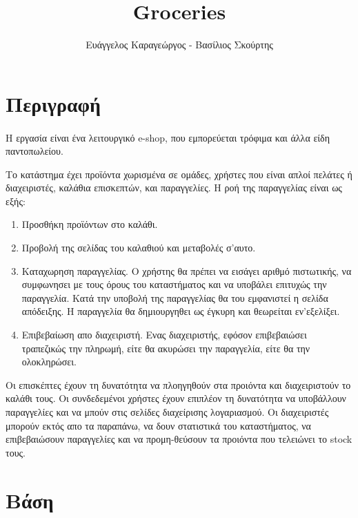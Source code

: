\documentclass[12pt]{article}
\title{Groceries}
\author{Ευάγγελος Καραγεώργος - Βασίλιος Σκούρτης }
\date{}
\begin{document}
  \maketitle
  \section{Περιγραφή}
  	\paragraph{}
  	  Η εργασία είναι ένα λειτουργικό e-shop, που εμπορεύεται τρόφιμα και άλλα είδη παντοπωλείου. 
  	  \par Το κατάστημα έχει προϊόντα χωρισμένα σε ομάδες, χρήστες που είναι απλοί πελάτες ή διαχειριστές, καλάθια επισκεπτών, και παραγγελίες. Η ροή της παραγγελίας είναι ως εξής:
  	  \begin{enumerate}
  	  	\item Προσθήκη προϊόντων στο καλάθι.
  	  	\item Προβολή της σελίδας του καλαθιού και μεταβολές σ'αυτο.
  	  	\item Καταχωρηση παραγγελίας. Ο χρήστης θα πρέπει να εισάγει αριθμό πιστωτικής, να συμφωνησει με τους όρους του καταστήματος και να υποβάλει επιτυχώς την παραγγελία. Κατά την υποβολή της παραγγελίας θα του εμφανιστεί η σελίδα απόδειξης. Η παραγγελία θα δημιουργηθει ως έγκυρη και θεωρείται εν'εξελίξει.
  	  	\item Επιβεβαίωση απο διαχειριστή. Ενας διαχειριστής, εφόσον επιβεβαιώσει τραπεζικώς την πληρωμή, είτε θα ακυρώσει την παραγγελία, είτε θα την ολοκληρώσει.
  	  \end{enumerate}
  	  \par Οι επισκέπτες έχουν τη δυνατότητα να πλοηγηθούν στα προιόντα και διαχειριστούν το καλάθι τους. Οι συνδεδεμένοι χρήστες έχουν επιπλέον τη δυνατότητα να υποβάλλουν παραγγελίες και να μπούν στις σελίδες διαχείρισης λογαριασμού. Οι διαχειριστές μπορούν εκτός απο τα παραπάνω, να δουν στατιστικά του καταστήματος, να επιβεβαιώσουν παραγγελίες και να προμη-θεύσουν τα προιόντα που τελειώνει το stock τους.
  \section{Βάση}
\end{document}
